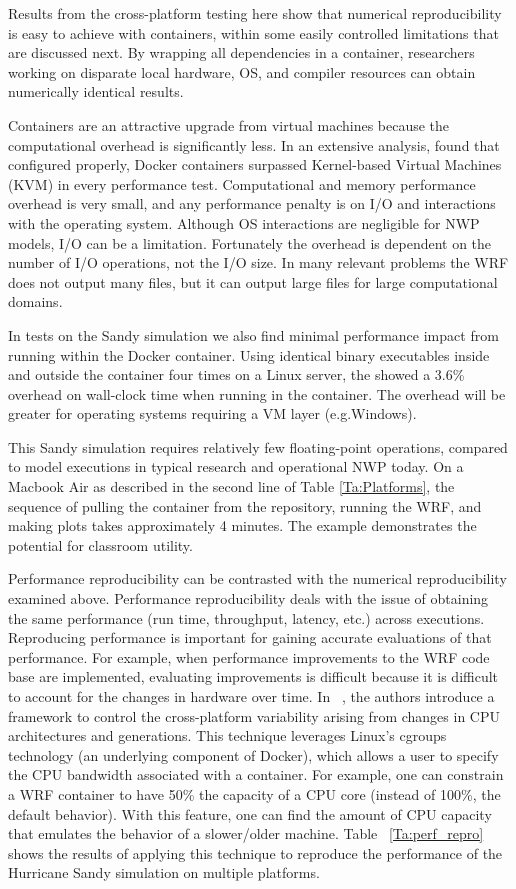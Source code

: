 \documentclass[final]{ametsoc}
\begin{document}
Results from the cross-platform testing here show that numerical reproducibility is easy to achieve with containers, within some easily controlled limitations that are discussed next.  By wrapping all dependencies in a container, researchers working on disparate local hardware, OS, and compiler resources can obtain numerically identical results.   

Containers are an attractive upgrade from virtual machines because the computational overhead is significantly less. In an extensive analysis, \citet{Felter:2014} found that configured properly, Docker containers surpassed Kernel-based Virtual Machines (KVM) in every performance test. Computational and memory performance overhead is very small, and any performance penalty is on I/O and interactions with the operating system. Although OS interactions are negligible for NWP models, I/O can be a limitation. Fortunately the overhead is dependent on the number of I/O operations, not the I/O size.  In many relevant problems the WRF does not output many files, but it can output large files for large computational domains.

In tests on the Sandy simulation we also find minimal performance impact from running within the Docker container. Using identical binary executables inside and outside the container four times on a Linux server, the showed a 3.6\% overhead on wall-clock time when running in the container. The overhead will be greater for operating systems requiring a VM layer (e.g.\@ Windows). 

This Sandy simulation requires relatively few floating-point operations, compared to model executions in typical research and operational NWP today. On a Macbook Air as described in the second line of Table \ref{Ta:Platforms}, the sequence of pulling the container from the repository, running the WRF, and making plots takes approximately 4 minutes. The example demonstrates the potential for classroom utility.

Performance reproducibility can be contrasted with the numerical reproducibility examined above. Performance reproducibility deals with the issue of obtaining the same performance (run time, throughput, latency, etc.) across executions. Reproducing performance is important for gaining accurate evaluations of that performance. For example, when performance improvements to the WRF code base are implemented, evaluating improvements is difficult because it is difficult to account for the changes in hardware over time. In ~\cite{Jimenez1605:Characterizing}, the authors introduce a framework to control the cross-platform variability arising from changes in CPU architectures and generations. This technique leverages Linux's cgroups technology (an underlying component of Docker), which allows a user to specify the CPU bandwidth associated with a container. For example, one can constrain a WRF container to have 50\% the capacity of a CPU core (instead of 100\%, the default behavior). With this feature, one can find the amount of CPU capacity that emulates the behavior of a slower/older machine. Table ~\ref{Ta:perf_repro} shows the results of applying this technique to reproduce the performance of the Hurricane Sandy simulation on multiple platforms.
\end{document}
